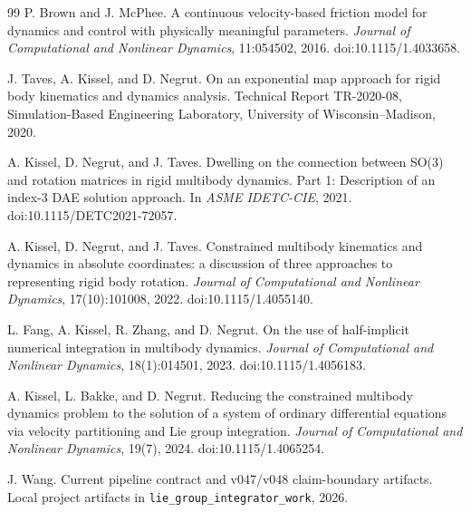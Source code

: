 \documentclass[10pt]{article}
\begin{document}
\begin{thebibliography}{99}
P. Brown and J. McPhee.
A continuous velocity-based friction model for dynamics and control with
physically meaningful parameters.
\emph{Journal of Computational and Nonlinear Dynamics}, 11:054502, 2016.
doi:10.1115/1.4033658.

J. Taves, A. Kissel, and D. Negrut.
On an exponential map approach for rigid body kinematics and dynamics
analysis.
Technical Report TR-2020-08, Simulation-Based Engineering Laboratory,
University of Wisconsin--Madison, 2020.

A. Kissel, D. Negrut, and J. Taves.
Dwelling on the connection between SO(3) and rotation matrices in rigid
multibody dynamics. Part 1: Description of an index-3 DAE solution approach.
In \emph{ASME IDETC-CIE}, 2021.
doi:10.1115/DETC2021-72057.

A. Kissel, D. Negrut, and J. Taves.
Constrained multibody kinematics and dynamics in absolute coordinates: a
discussion of three approaches to representing rigid body rotation.
\emph{Journal of Computational and Nonlinear Dynamics}, 17(10):101008, 2022.
doi:10.1115/1.4055140.

L. Fang, A. Kissel, R. Zhang, and D. Negrut.
On the use of half-implicit numerical integration in multibody dynamics.
\emph{Journal of Computational and Nonlinear Dynamics}, 18(1):014501, 2023.
doi:10.1115/1.4056183.

A. Kissel, L. Bakke, and D. Negrut.
Reducing the constrained multibody dynamics problem to the solution of a
system of ordinary differential equations via velocity partitioning and Lie
group integration.
\emph{Journal of Computational and Nonlinear Dynamics}, 19(7), 2024.
doi:10.1115/1.4065254.

J. Wang.
Current pipeline contract and v047/v048 claim-boundary artifacts.
Local project artifacts in \texttt{lie\_group\_integrator\_work}, 2026.

\end{thebibliography}
\end{document}
